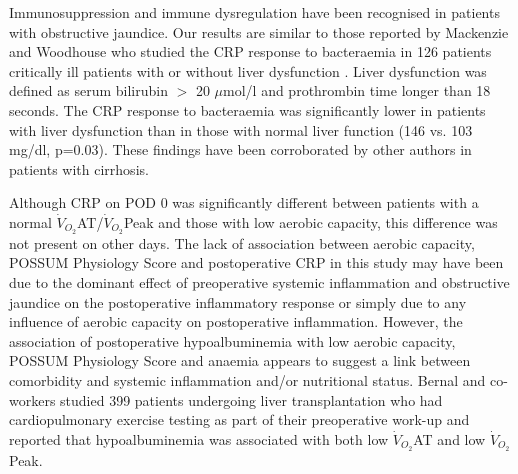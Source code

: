 Immunosuppression and immune dysregulation have been recognised in patients with obstructive jaundice\parencite{scott-conner_pathophysiology_1994}.
Our results are similar to those reported by Mackenzie and Woodhouse who studied the CRP response to bacteraemia in 126 patients critically ill patients with or without liver dysfunction \parencite{mackenzie_c-reactive_2006}. 
Liver dysfunction was defined as serum bilirubin $>$ 20 $\mu$mol/l and prothrombin time longer than 18 seconds. 
The CRP response to bacteraemia was significantly lower in patients with liver dysfunction than in those with normal liver function (146 vs. 103 mg/dl, p=0.03). 
These findings have been corroborated by other authors in patients with cirrhosis\parencite{pieri_c-reactive_2014, janum_c-reactive_2011}.



Although CRP on POD 0 was significantly different between patients with a normal $\dot{V}_{O_2}$AT/$\dot{V}_{O_2}$Peak and those with low aerobic capacity, this difference was not present on other days. 
The lack of association between aerobic capacity, POSSUM Physiology Score and postoperative CRP in this study may have been due to the dominant effect of preoperative systemic inflammation and obstructive jaundice on the postoperative inflammatory response or simply due to any influence of aerobic capacity on postoperative inflammation.
However, the association of postoperative hypoalbuminemia with low aerobic capacity, POSSUM Physiology Score and anaemia appears to suggest a link between comorbidity and systemic inflammation and/or nutritional status.
Bernal and co-workers studied 399 patients undergoing liver transplantation who had cardiopulmonary exercise testing as part of their preoperative work-up\parencite{bernal_aerobic_2014} and reported that hypoalbuminemia was associated with both low $\dot{V}_{O_2}$AT and low $\dot{V}_{O_2}$Peak.


